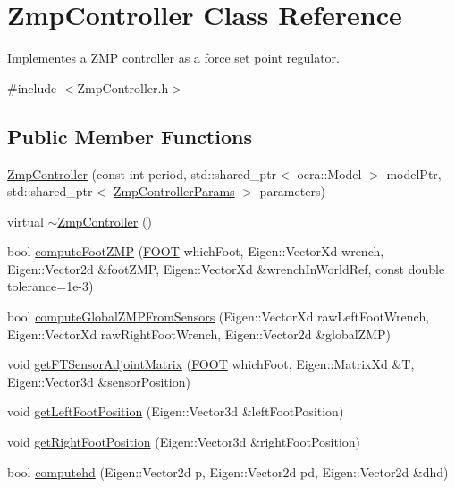 \hypertarget{classZmpController}{}\section{Zmp\+Controller Class Reference}
\label{classZmpController}


Implementes a Z\+MP controller as a force set point regulator.  




{\ttfamily \#include $<$Zmp\+Controller.\+h$>$}

\subsection*{Public Member Functions}
\begin{DoxyCompactItemize}
\item 
\hyperlink{classZmpController_a4c47608f6d62b6b490808816879c01b7}{Zmp\+Controller} (const int period, std\+::shared\+\_\+ptr$<$ ocra\+::\+Model $>$ model\+Ptr, std\+::shared\+\_\+ptr$<$ \hyperlink{structZmpControllerParams}{Zmp\+Controller\+Params} $>$ parameters)
\item 
virtual \hyperlink{classZmpController_af308a70e70cfe9a1e9569606da8b1739}{$\sim$\+Zmp\+Controller} ()
\item 
bool \hyperlink{classZmpController_a6fd41771d83a31bd190f4031f82649e0}{compute\+Foot\+Z\+MP} (\hyperlink{ZmpController_8h_a4b6a8e135f90bd56e5a57a60efb42529}{F\+O\+OT} which\+Foot, Eigen\+::\+Vector\+Xd wrench, Eigen\+::\+Vector2d \&foot\+Z\+MP, Eigen\+::\+Vector\+Xd \&wrench\+In\+World\+Ref, const double tolerance=1e-\/3)
\item 
bool \hyperlink{classZmpController_aae5cc381a922206dad10ba2d425992ce}{compute\+Global\+Z\+M\+P\+From\+Sensors} (Eigen\+::\+Vector\+Xd raw\+Left\+Foot\+Wrench, Eigen\+::\+Vector\+Xd raw\+Right\+Foot\+Wrench, Eigen\+::\+Vector2d \&global\+Z\+MP)
\item 
void \hyperlink{classZmpController_aad272bd33de6fad489ea99618a7e9afa}{get\+F\+T\+Sensor\+Adjoint\+Matrix} (\hyperlink{ZmpController_8h_a4b6a8e135f90bd56e5a57a60efb42529}{F\+O\+OT} which\+Foot, Eigen\+::\+Matrix\+Xd \&T, Eigen\+::\+Vector3d \&sensor\+Position)
\item 
void \hyperlink{classZmpController_ac8e821f72c79fe86102f02c4c155ad30}{get\+Left\+Foot\+Position} (Eigen\+::\+Vector3d \&left\+Foot\+Position)
\item 
void \hyperlink{classZmpController_a815cd495f657cbd93c25610d24982e8c}{get\+Right\+Foot\+Position} (Eigen\+::\+Vector3d \&right\+Foot\+Position)
\item 
bool \hyperlink{classZmpController_a5eab881a51fb2ace1a1d494171353bc7}{computehd} (Eigen\+::\+Vector2d p, Eigen\+::\+Vector2d pd, Eigen\+::\+Vector2d \&dhd)
\end{DoxyCompactItemize}
